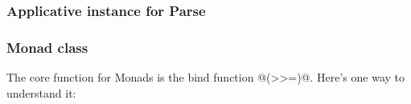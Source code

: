 \documentclass{beamer}
\begin{document}
%
%
%


\begin{frame}
  \frametitle{Applicative instance for Parse}



\end{frame}


%
%
%
%
%
%



\begin{frame}

  \frametitle{Monad class}
  The core function for Monads is the bind function @(>>=)@. Here's one way to understand it:



\end{frame}
\end{document}
